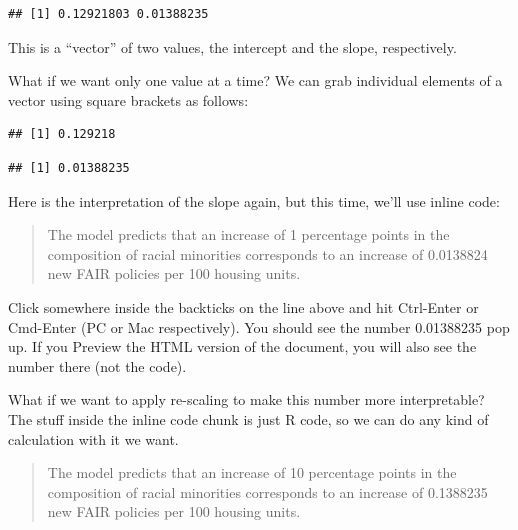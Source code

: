 \documentclass[
]{book}
\newenvironment{Shaded}{\begin{snugshade}}{\end{snugshade}}
\newcommand{\DecValTok}[1]{\textcolor[rgb]{0.00,0.00,0.81}{#1}}
\newcommand{\NormalTok}[1]{#1}
\newcommand{\SpecialCharTok}[1]{\textcolor[rgb]{0.00,0.00,0.00}{#1}}
\begin{document}
\begin{verbatim}
## [1] 0.12921803 0.01388235
\end{verbatim}

This is a ``vector'' of two values, the intercept and the slope, respectively.

What if we want only one value at a time? We can grab individual elements of a vector using square brackets as follows:

\begin{Shaded}
\end{Shaded}

\begin{verbatim}
## [1] 0.129218
\end{verbatim}

\begin{Shaded}
\end{Shaded}

\begin{verbatim}
## [1] 0.01388235
\end{verbatim}

Here is the interpretation of the slope again, but this time, we'll use inline code:

\begin{quote}
The model predicts that an increase of 1 percentage points in the composition of racial minorities corresponds to an increase of 0.0138824 new FAIR policies per 100 housing units.
\end{quote}

Click somewhere inside the backticks on the line above and hit Ctrl-Enter or Cmd-Enter (PC or Mac respectively). You should see the number 0.01388235 pop up. If you Preview the HTML version of the document, you will also see the number there (not the code).

What if we want to apply re-scaling to make this number more interpretable? The stuff inside the inline code chunk is just R code, so we can do any kind of calculation with it we want.

\begin{quote}
The model predicts that an increase of 10 percentage points in the composition of racial minorities corresponds to an increase of 0.1388235 new FAIR policies per 100 housing units.
\end{quote}
\end{document}

